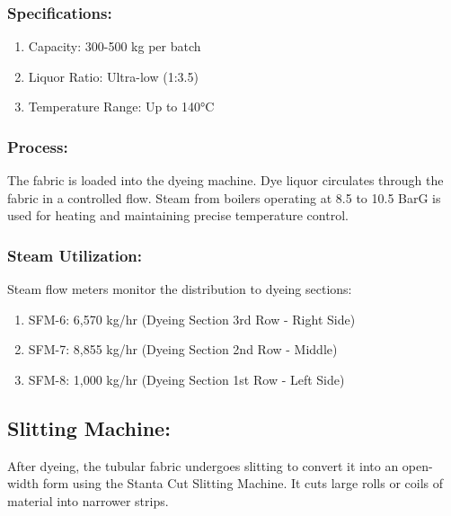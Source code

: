 \subsubsection{Specifications:}
\begin{enumerate}
  \item Capacity: 300-500 kg per batch
  \item Liquor Ratio: Ultra-low (1:3.5)
  \item Temperature Range: Up to 140°C
\end{enumerate}

\subsubsection{Process:}
The fabric is loaded into the dyeing machine.
Dye liquor circulates through the fabric in a controlled flow.
Steam from boilers operating at 8.5 to 10.5 BarG is used for heating and maintaining precise temperature control.

\subsubsection{Steam Utilization:}
Steam flow meters monitor the distribution to dyeing sections:
\begin{enumerate}
  \item SFM-6: 6,570 kg/hr (Dyeing Section 3rd Row - Right Side)
  \item SFM-7: 8,855 kg/hr (Dyeing Section 2nd Row - Middle)
  \item SFM-8: 1,000 kg/hr (Dyeing Section 1st Row - Left Side)
\end{enumerate}
  
\subsection{Slitting Machine:}

After dyeing, the tubular fabric undergoes slitting to convert it into an open-width form using the Stanta Cut Slitting Machine.
It cuts large rolls or coils of material into narrower strips.



